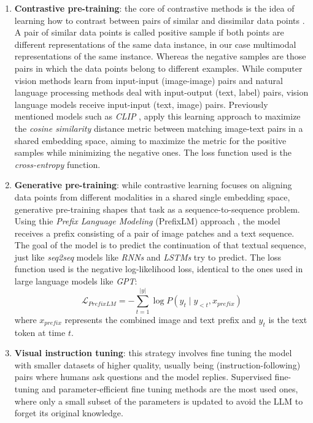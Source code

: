 \begin{enumerate}
	\item \textbf{Contrastive pre-training}: the core of contrastive methods is the idea  of learning how to contrast between pairs of similar and dissimilar data points \cite{rethmeier2021primercontrastivepretraininglanguage}. A pair of similar data points is called positive sample if both points are different representations of the same data instance, in our case multimodal representations of the same instance. Whereas the negative samples are those pairs in which the data points belong to different examples. While computer vision methods learn from input-input (image-image) pairs and natural language processing methods deal with input-output (text, label) pairs, vision language models receive input-input (text, image) pairs. Previously mentioned models such as \textit{CLIP} \cite{radford2021learningtransferablevisualmodels}, apply this learning approach to maximize the \textit{cosine similarity} distance metric between matching image-text pairs in a shared embedding space, aiming to maximize the metric for the positive samples while minimizing the negative ones. The loss function used is the \textit{cross-entropy} function.
	
	\item \textbf{Generative pre-training}: while contrastive learning focuses on aligning data points from different modalities in a shared single embedding space, generative pre-training shapes that task as a sequence-to-sequence problem. Using thie \textit{Prefix Language Modeling} (PrefixLM) approach \cite{wang2022simvlmsimplevisuallanguage}, the model receives a prefix consisting of a pair of image patches and a text sequence. The goal of the model is to predict the continuation of that textual sequence, just like \textit{seq2seq} models like \textit{RNNs} and \textit{LSTMs} try to predict. The loss function used is the negative log-likelihood loss, identical to the ones used in large language models like \textit{GPT}:
		$$\mathcal{L}_{PrefixLM} = -\sum_{t=1}^{|y|} \log P(y_t \mid y_{<t}, x_{prefix})$$
	where $x_{prefix}$ represents the combined image and text prefix and $y_{t}$ is the text token at time $t$. 

	\item \textbf{Visual instruction tuning}: this strategy involves fine tuning the model with smaller datasets of higher quality, usually being (instruction-following) pairs where humans ask questions and the model replies. Supervised fine-tuning and parameter-efficient fine tuning methods are the most used ones, where only a small subset of the parameters is updated to avoid the LLM to forget its original knowledge. 
	
	
\end{enumerate}

